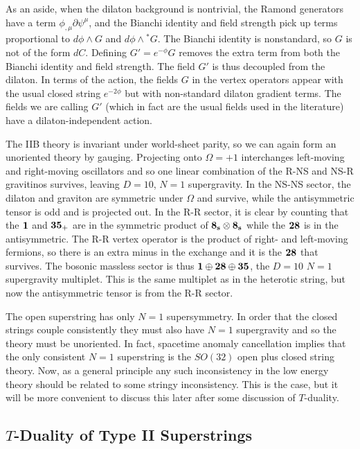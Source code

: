 \documentclass[12pt]{article}
\begin{document}
As an aside, when the dilaton background is nontrivial, the Ramond
generators have a term $\phi_{,\mu} \partial\psi^\mu$, and the Bianchi
identity and field strength pick up terms proportional to
$d\phi \wedge G$ and $d\phi \wedge {}^*G$.  The Bianchi identity is
nonstandard, so $G$ is not of the form $dC$.  Defining $G' = e^{-\phi} G$
removes the extra term from both the Bianchi identity and field strength.
The field $G'$ is thus decoupled from the dilaton.
In terms of the action, the fields $G$ in the vertex operators appear
with the usual closed string $e^{-2\phi}$ but with non-standard dilaton
gradient terms.  The fields we are calling $G'$ (which in fact are the
usual fields used in the literature) have a dilaton-independent action.

The IIB theory is invariant under world-sheet parity, so we can again
form an unoriented theory by gauging.  
Projecting onto $\Omega =+1$ interchanges left-moving and right-moving 
oscillators and so one linear combination of the R-NS and NS-R gravitinos
survives, leaving $D=10$, $N=1$ supergravity.  In the NS-NS sector, the
dilaton and graviton are symmetric under $\Omega$ and survive, while the
antisymmetric tensor is odd and is projected out. In the R-R sector, it
is clear by counting that the $\bf 1$ and ${\bf 35}_+$ are in the
symmetric product of ${\bf 8_s} \otimes {\bf 8_s}$ while the $\bf 28$ is
in the antisymmetric.  The R-R vertex operator is the product of right-
and left-moving fermions, so there is an extra minus in the exchange and
it is the $\bf 28$ that survives.  The bosonic massless sector is
thus ${\bf 1} \oplus {\bf 28}  \oplus {\bf 35}$, the $D=10$ $N=1$
supergravity multiplet.  This is the same multiplet as in the heterotic
string, but now the antisymmetric tensor is from the R-R sector.

The open superstring has only $N=1$ supersymmetry.  In order that the
closed strings couple consistently they must also have $N=1$ supergravity
and so the theory must be unoriented.  In fact, spacetime anomaly
cancellation implies that the only consistent $N=1$ superstring is the
$SO(32)$ open plus closed string theory.  Now, as a general principle any
such inconsistency in the low energy theory should be related to some stringy
inconsistency.  This is the case, but it will be more convenient to
discuss this later after some discussion of $T$-duality.

\subsection{$T$-Duality of Type II Superstrings}
\end{document}
